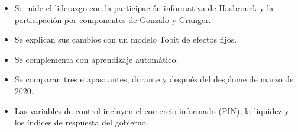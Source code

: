 \documentclass{article}
\newcommand{\cardtitlesize}{\fontsize{35.4}{42.5}\selectfont}
\newcommand{\cardtitle}[2][navy]{{\color{#1}\cardtitlesize\bfseries\textls[110]{\MakeUppercase{#2}}}\par\vspace{7mm}}
\begin{document}
\vfill
\hspace*{34mm}\begin{minipage}{773mm}
\begin{tcolorbox}[card]\cardtitle{Metodología}
\begin{minipage}[t]{0.48\linewidth}
\begin{itemize}
\item Se mide el liderazgo con la participación informativa de Hasbrouck y la participación por componentes de Gonzalo y Granger.
\item Se explican sus cambios con un modelo Tobit de efectos fijos.
\item Se complementa con aprendizaje automático.
\end{itemize}
\end{minipage}\hfill
\begin{minipage}[t]{0.48\linewidth}
\begin{itemize}
\item Se comparan tres etapas: antes, durante y después del desplome de marzo de 2020.
\item Las variables de control incluyen el comercio informado (PIN), la liquidez y los índices de respuesta del gobierno.
\end{itemize}
\end{minipage}
\end{tcolorbox}
\end{minipage}
\end{document}
